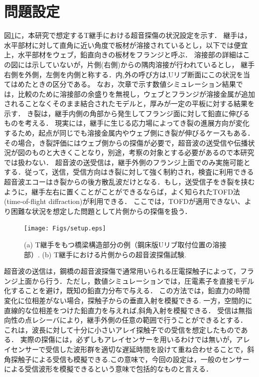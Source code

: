 ﻿%
\section{問題設定}
図\ref{fig:fig2_0}に，本研究で想定するT継手における超音探傷の状況設定を示す．
継手は，水平部材に対して直角に近い角度で板材が溶接されているとし，以下では便宜上，水平部材をウェブ，鉛直向きの板材をフランジと呼ぶ．
溶接部の詳細はこの図には示していないが，片側(右側)からの隅肉溶接が行われているとし，
継手右側を外側，左側を内側と称する．内,外の呼び方は,Uリブ断面にこの状況を当てはめたときの区分である。
なお，次章で示す数値シミュレーション結果では，比較のために溶接部の余盛りを無視し，ウェブとフランジが溶接金属が追加されることなくそのまま結合されたモデルと，厚みが一定の平板に対する結果を示す．
き裂は，継手内側の角部から発生してフランジ面に対して鉛直に伸びるものを考える．
現実には，継手に生じる応力場によってき裂の進展方向が変化するため，起点が同じでも溶接金属内やウェブ側にき裂が伸びるケースもある．その場合，き裂評価にはウェブ側からの探傷が必要で，超音波の送受信や伝播状況が図のものと大きくことなり，別途，考察の対象とする必要があるので本研究では扱わない．
超音波の送受信は，継手外側のフランジ上面でのみ実施可能とする．従って，送信，受信方向はき裂に対して強く制約され，検査に利用できる超音波エコーはき裂からの後方散乱波だけとなる．もし，送受信子をき裂を挟むように，継手左右に置くことがことができるならば，よく知られたTOFD法(time-of-flight diffraction)が利用できる．
ここでは，TOFDが適用できない、より困難な状況を想定した問題として片側からの探傷を扱う．
\begin{figure}[h]
	\begin{center}
	\texttt{[image: Figs/setup.eps]} 
	\end{center}
	\caption{
		(a) T継手をもつ橋梁構造部分の例（鋼床版Uリブ取付位置の溶接部）.
		(b) T継手における片側からの超音波探傷試験.
	} 
	\label{fig:fig2_0}
\end{figure}
超音波の送信は，鋼橋の超音波探傷で通常用いられる圧電探触子によって，フランジ上面から行う．ただし，数値シミュレーションでは，圧電素子を直接モデル化することを避け，既知の鉛直力分布で与える．
この方法では，鉛直力の時間変化に位相差がない場合，探触子からの垂直入射を模擬できる.
一方，空間的に直線的な位相差をつけた鉛直力を与えれば,斜角入射を模擬できる．
受信は無指向性の点レシーバにより，継手外側の任意の範囲で行うことができるとする．
これは，波長に対して十分に小さいアレイ探触子での受信を想定したものである．
実際の探傷には，必ずしもアレイセンサーを用いるわけでは無いが，アレイセンサーで受信した波形群を適切な遅延時間を設けて重ね合わせることで，斜角探触子による受信も模擬できる.この意味で，今回の設定は，一般のセンサー
による受信波形を模擬できるという意味で包括的なものと言える．
